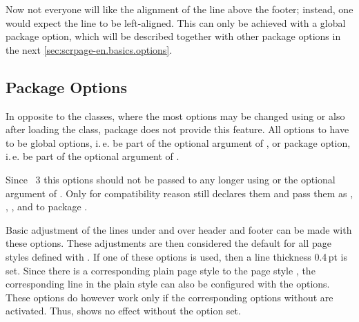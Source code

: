 %
Now not everyone will like the alignment of the line above the footer;
instead, one would expect the line to be left-aligned. This can only
be achieved with a global package option, which will be described
together with other package options in the next
\autoref{sec:scrpage-en.basics.options}.%
%
\EndIndexGroup
\EndIndexGroup


\subsection{Package Options}
\label{sec:scrpage-en.basics.options}

In opposite to the \KOMAScript{} classes, where the most options may be
changed using  or  also after loading the
class, package  does not provide this feature. All options to  have to be global options,
i.\,e. be part of the optional argument of , or
package option, i.\,e. be part of the optional argument of .

\begin{Declaration}
\end{Declaration}%
Since \KOMAScript~3
this options should not be passed to  any longer using
 or the optional argument of
. Only for compatibility reason  still
declares them and pass them as ,
, , and
 to package .
\EndIndexGroup


\begin{Declaration}
\end{Declaration}%
Basic adjustment of the lines under and over header and footer can be
made with these options.  These adjustments are then considered the
default for all page styles defined with .  If one
of these options is used, then a line thickness 0.4\,pt is set.
Since there is a corresponding plain page style to the
page style , the corresponding line in the plain
style can also be configured with the  options.
These  options do however work only if the corresponding
options without  are activated.  Thus,
 shows no effect without the
 option set.

